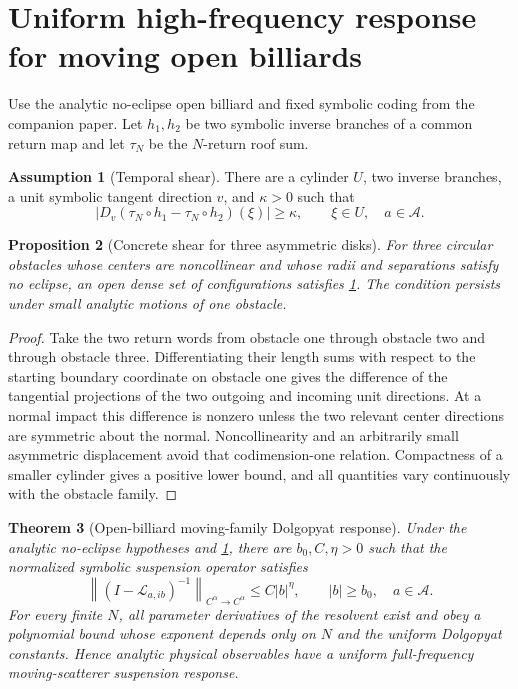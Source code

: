 \documentclass[11pt,reqno]{amsart}
\newtheorem{theorem}{Theorem}[section]
\newtheorem{proposition}[theorem]{Proposition}
\theoremstyle{definition}
\newtheorem{assumption}[theorem]{Assumption}
\theoremstyle{remark}
\newcommand{\A}{\mathcal A}
\newcommand{\norm}[1]{\left\lVert #1\right\rVert}
\newcommand{\abs}[1]{\left\lvert #1\right\rvert}
\begin{document}
\section{Uniform high-frequency response for moving open billiards}

Use the analytic no-eclipse open billiard and fixed symbolic coding from the
companion paper.  Let $h_1,h_2$ be two symbolic inverse branches of a common
return map and let $\tau_N$ be the $N$-return roof sum.

\begin{assumption}[Temporal shear]\label{ass:shear}
There are a cylinder $U$, two inverse branches, a unit symbolic tangent
direction $v$, and $\kappa>0$ such that
\begin{equation}\label{eq:shear}
 \abs{D_v(\tau_N\circ h_1-\tau_N\circ h_2)(\xi)}\ge\kappa,
 \qquad \xi\in U,\quad a\in\A.
\end{equation}
\end{assumption}

\begin{proposition}[Concrete shear for three asymmetric disks]\label{prop:disk-shear}
For three circular obstacles whose centers are noncollinear and whose radii and
separations satisfy no eclipse, an open dense set of configurations satisfies
\cref{ass:shear}.  The condition persists under small analytic motions of one
obstacle.
\end{proposition}

\begin{proof}
Take the two return words from obstacle one through obstacle two and through
obstacle three.  Differentiating their length sums with respect to the starting
boundary coordinate on obstacle one gives the difference of the tangential
projections of the two outgoing and incoming unit directions.  At a normal
impact this difference is nonzero unless the two relevant center directions
are symmetric about the normal.  Noncollinearity and an arbitrarily small
asymmetric displacement avoid that codimension-one relation.  Compactness of a
smaller cylinder gives a positive lower bound, and all quantities vary
continuously with the obstacle family.
\end{proof}

\begin{theorem}[Open-billiard moving-family Dolgopyat response]\label{thm:open-HF}
Under the analytic no-eclipse hypotheses and \cref{ass:shear}, there are
$b_0,C,\eta>0$ such that the normalized symbolic suspension operator satisfies
\[
 \norm{(I-\mathscr L_{a,ib})^{-1}}_{C^\alpha\to C^\alpha}
 \le C\abs b^\eta,
 \qquad \abs b\ge b_0,\quad a\in\A.
\]
For every finite $N$, all parameter derivatives of the resolvent exist and
obey a polynomial bound whose exponent depends only on $N$ and the uniform
Dolgopyat constants.  Hence analytic physical observables have a uniform
full-frequency moving-scatterer suspension response.
\end{theorem}
\end{document}
